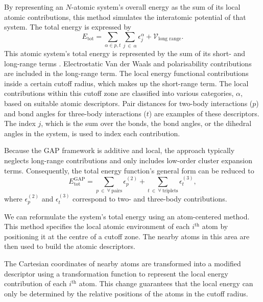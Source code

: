 \newpage

By representing an $N$-atomic system's overall energy as the sum of its local atomic contributions, this method simulates the interatomic potential of that system.
The total energy is expressed by
\begin{equation}
    \label{equ:2.46}
     E_{\text{tot}} = \sum_{\alpha\in p,t}\sum_{j\:\in\:\alpha}\epsilon_{j}^{\alpha} + \mathcal{V}_{\text{long range}}.
\end{equation}
This atomic system's total energy is represented by the sum of its short- and long-range terms \cite{Bartk2015, Bartk2013, Deringer2021}. 
Electrostatic Van der Waals and polarisability contributions are included in the long-range term.
The local energy functional contributions inside a certain cutoff radius, which makes up the short-range term.
The local contributions within this cutoff zone are classified into various categories, $\alpha$, based on suitable atomic descriptors.
Pair distances for two-body interactions ($p$) and bond angles for three-body interactions ($t$)%
are examples of these descriptors.
The index $j$, which is the sum over the bonds, the bond angles, or the dihedral angles in the system, is used to index each contribution.

Because the GAP framework is additive and local, the approach typically neglects long-range contributions and only includes low-order cluster expansion terms. 
Consequently, the total energy function's general form can be reduced to
\begin{equation}
    \label{equ:2.47}
     E^{\text{GAP}}_{\text{tot}} = \sum_{p\:\in\:\forall\:\text{pairs}}\epsilon_{p}^{(2)} + \sum_{t\:\in\:\forall\:\text{triplets}}\epsilon_{t}^{(3)},
\end{equation}
where $\epsilon_{p}^{(2)}$ and $\epsilon_{t}^{(3)}$ correspond to two- and three-body contributions.

We can reformulate the system's total energy using an atom-centered method. This method specifies the local atomic environment of each $i^{\text{th}}$ atom by positioning it at the centre of a cutoff zone. The nearby atoms in this area are then used to build the atomic descriptors.

The Cartesian coordinates of nearby atoms are transformed into a modified descriptor using a transformation function to represent the local energy contribution of each $i^{\text{th}}$ atom. This change guarantees that the local energy can only be determined by the relative positions of the atoms in the cutoff radius.  

